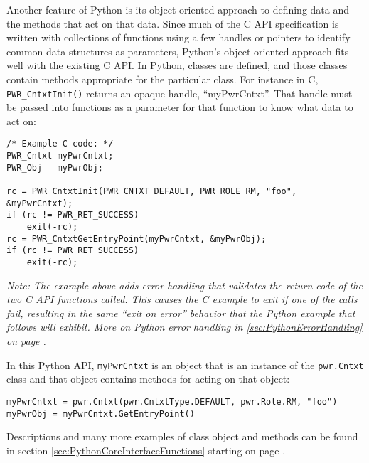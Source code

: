 Another feature of Python is its object-oriented approach to defining data and
the methods that act on that data. Since much of the C API specification is
written with collections of functions using a few handles or pointers to
identify common data structures as parameters, Python's object-oriented
approach fits well with the existing C API. In Python, classes are defined, and
those classes contain methods appropriate for the particular class. For
instance in C, \texttt{PWR_CntxtInit()} returns an opaque handle,
``myPwrCntxt''. That handle must be passed into functions as a parameter for
that function to know what data to act on:

\begin{center}\begin{minipage}{.95\linewidth}\begin{lstlisting}
/* Example C code: */
PWR_Cntxt myPwrCntxt;
PWR_Obj   myPwrObj;

rc = PWR_CntxtInit(PWR_CNTXT_DEFAULT, PWR_ROLE_RM, "foo", &myPwrCntxt);
if (rc != PWR_RET_SUCCESS)
	exit(-rc);
rc = PWR_CntxtGetEntryPoint(myPwrCntxt, &myPwrObj);
if (rc != PWR_RET_SUCCESS)
	exit(-rc);
\end{lstlisting}\end{minipage}\end{center}

\emph{Note: The example above adds error handling that validates the return code of the two
C API functions called. This causes the C example to exit if one of the calls
fail, resulting in the same ``exit on error'' behavior that the Python example
that follows will exhibit. More on Python error handling in
\ref{sec:PythonErrorHandling} on page \pageref{sec:PythonErrorHandling}.}

In this Python API, \texttt{myPwrCntxt} is an object that is an instance of the
\texttt{pwr.Cntxt} class and that object contains methods for acting on that
object:

\begin{center}\begin{minipage}{.95\linewidth}\begin{lstlisting}
myPwrCntxt = pwr.Cntxt(pwr.CntxtType.DEFAULT, pwr.Role.RM, "foo")
myPwrObj = myPwrCntxt.GetEntryPoint()
\end{lstlisting}\end{minipage}\end{center}

Descriptions and many more examples of class object and methods can be found in
section \ref{sec:PythonCoreInterfaceFunctions} starting on page
\pageref{sec:PythonCoreInterfaceFunctions}.


